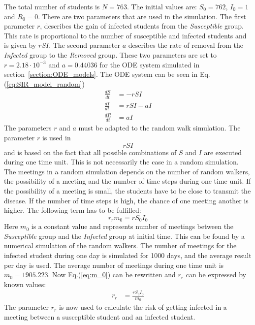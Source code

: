 \documentclass[%
twoside,                 %
final,                   %
chapterprefix=true,      %
open=right               %
10pt]{book}
\begin{document}
\noindent
The total number of students is $N=763$. The initial values are: $S_0=762$, $I_0=1$ and $R_0=0$. There are two parameters that are used in the simulation. The first parameter $r$, describes the gain of infected students from the \emph{Susceptible} group. This rate is proportional to the number of susceptible and infected students and is given by $rSI$. The second parameter $a$ describes the rate of removal from the \emph{Infected} group to the \emph{Removed} group. These two parameters are set to $r=2.18\cdot 10^{-3}$ and $a=0.44036$ for the ODE system simulated in section~\ref{section:ODE_models}. The ODE system can be seen in Eq.(\ref{eq:SIR_model_random})
\begin{equation} \label{eq:SIR_model_random}
	\begin{aligned} 
	\frac{dS}{dt} &= -rSI \\ 
	\frac{dI}{dt} &= rSI-aI \\ 
	\frac{dR}{dt} &= aI 
	\end{aligned}
\end{equation}
The parameters $r$ and $a$ must be adapted to the random walk simulation. The parameter $r$ is used in
\begin{equation} \label{eq:rSI}
rSI
\end{equation}
and is based on the fact that all possible combinations of $S$ and $I$ are executed during one time unit. This is not necessarily the case in a random simulation. The meetings in a random simulation depends on the number of random walkers, the possibility of a meeting and the number of time steps during one time unit. If the possibility of a meeting is small, the students have to be close to transmit the disease. If the number of time steps is high, the chance of one meeting another is higher. The following term has to be fulfilled: 
\begin{equation} \label{eq:m_0}
r_r m_0 = rS_0I_0
\end{equation}
Here $m_0$ is a constant value and represents number of meetings between the \emph{Susceptible} group and the \emph{Infected} group at initial time. This can be found by a numerical simulation of the random walkers. The number of meetings for the infected student during one day is simulated for 1000 days, and the average result per day is used. The average number of meetings during one time unit is $m_0=1905.223$. Now Eq.(\ref{eq:m_0}) can be rewritten and $r_r$ can be expressed by known values: 
\begin{equation} \label{eq:m_0_2}
	\begin{aligned} 
	r_r &= \frac{rS_0I_0}{m_0}
	\end{aligned}
\end{equation}
The parameter $r_r$ is now used to calculate the risk of getting infected in a meeting between a susceptible student and an infected student. 
\end{document}
